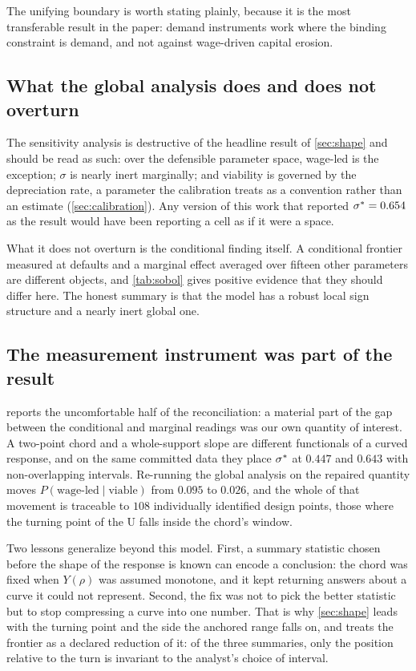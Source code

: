 The unifying boundary is worth stating plainly, because it is the most
transferable result in the paper: demand instruments work where the
binding constraint is demand, and not against wage-driven capital erosion.

\subsection{What the global analysis does and does not overturn}

The sensitivity analysis is destructive of the headline result of
\cref{sec:shape} and should be read as such: over the defensible parameter space, wage-led is the
exception; $\sigma$ is nearly inert marginally; and viability is governed by the
depreciation rate, a parameter the calibration treats as a convention rather
than an estimate (\cref{sec:calibration}). Any
version of this work that reported $\sigma^{\ast} = 0.654$ as the result
would have been reporting a cell as if it were a space.

What it does not overturn is the conditional finding itself. A conditional
frontier measured at defaults and a marginal effect averaged over fifteen
other parameters are different objects, and \cref{tab:sobol} gives positive
evidence that they should differ here. The honest summary is that the model
has a robust local sign structure and a nearly inert global one.

\subsection{The measurement instrument was part of the result}

 reports the uncomfortable half of the reconciliation: a
material part of the gap between the conditional and marginal readings was our
own quantity of interest. A two-point chord and a whole-support slope are
different functionals of a curved response, and on the same committed data
they place $\sigma^{\ast}$ at $0.447$ and $0.643$ with non-overlapping intervals.
Re-running the global analysis on the repaired quantity moves
$P(\text{wage-led} \mid \text{viable})$ from $0.095$ to $0.026$, and the
whole of that movement is traceable to $108$ individually identified design
points, those where the turning point of the U falls inside the chord's
window.

Two lessons generalize beyond this model. First, a summary statistic
chosen before the shape of the response is known can encode a conclusion: the
chord was fixed when $Y(\rho)$ was assumed monotone, and it kept returning
answers about a curve it could not represent. Second, the fix was not to pick
the better statistic but to stop compressing a curve into one number.
That is why \cref{sec:shape} leads with the turning point and the side the
anchored range falls on, and treats the frontier as a declared reduction of
it: of the three summaries, only the position relative to the turn is
invariant to the analyst's choice of interval.

